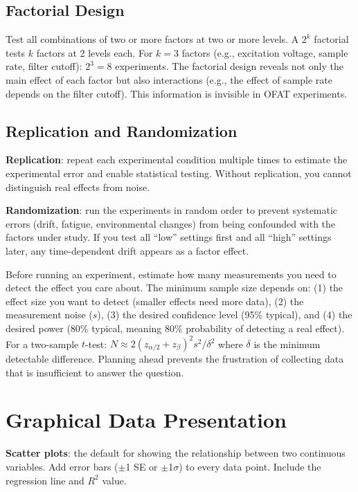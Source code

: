 \documentclass[11pt,letterpaper,twoside,openany]{book}
\begin{document}
\subsection{Factorial Design}
Test all combinations of two or more factors at two or more levels. A $2^k$ factorial tests $k$ factors at 2 levels each. For $k = 3$ factors (e.g., excitation voltage, sample rate, filter cutoff): $2^3 = 8$ experiments. The factorial design reveals not only the main effect of each factor but also interactions (e.g., the effect of sample rate depends on the filter cutoff). This information is invisible in OFAT experiments.

\subsection{Replication and Randomization}
\textbf{Replication}: repeat each experimental condition multiple times to estimate the experimental error and enable statistical testing. Without replication, you cannot distinguish real effects from noise.

\textbf{Randomization}: run the experiments in random order to prevent systematic errors (drift, fatigue, environmental changes) from being confounded with the factors under study. If you test all ``low'' settings first and all ``high'' settings later, any time-dependent drift appears as a factor effect.

\begin{tipbox}
Before running an experiment, estimate how many measurements you need to detect the effect you care about. The minimum sample size depends on: (1) the effect size you want to detect (smaller effects need more data), (2) the measurement noise ($s$), (3) the desired confidence level (95\% typical), and (4) the desired power (80\% typical, meaning 80\% probability of detecting a real effect). For a two-sample $t$-test: $N \approx 2(z_{\alpha/2} + z_{\beta})^2 s^2 / \delta^2$ where $\delta$ is the minimum detectable difference. Planning ahead prevents the frustration of collecting data that is insufficient to answer the question.
\end{tipbox}

\section{Graphical Data Presentation}
\textbf{Scatter plots}: the default for showing the relationship between two continuous variables. Add error bars ($\pm$1 SE or $\pm$1$\sigma$) to every data point. Include the regression line and $R^2$ value.
\end{document}
